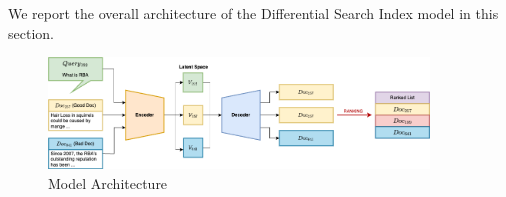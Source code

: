We report the overall architecture of the Differential Search Index model in this section. 
\begin{figure}
  \centering
  \includegraphics[width=0.9\textwidth]{figs/model.png}
  \caption{Model Architecture}
  \label{fig:model}
\end{figure}
